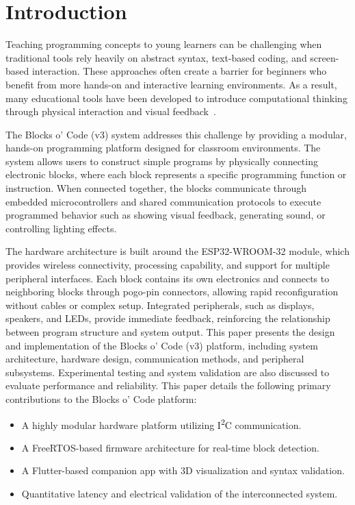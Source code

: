 \documentclass[10pt, conference]{IEEEtran}
\begin{document}
\section{Introduction}
Teaching programming concepts to young learners can be challenging when traditional tools rely heavily on abstract syntax, text-based coding, and screen-based interaction. These approaches often create a barrier for beginners who benefit from more hands-on and interactive learning environments. As a result, many educational tools have been developed to introduce computational thinking through physical interaction and visual feedback~\cite{educational,tangible}. 

The Blocks o’ Code (v3) system addresses this challenge by providing a modular, hands-on programming platform designed for classroom environments. The system allows users to construct simple programs by physically connecting electronic blocks, where each block represents a specific programming function or instruction. When connected together, the blocks communicate through embedded microcontrollers and shared communication protocols to execute programmed behavior such as showing visual feedback, generating sound, or controlling lighting effects. 

The hardware architecture is built around the ESP32-WROOM-32 module, which provides 
wireless connectivity, processing capability, and support for multiple peripheral interfaces. Each block contains its own electronics and connects to neighboring blocks through pogo-pin connectors, allowing rapid reconfiguration without cables or complex setup. Integrated peripherals, such as displays, speakers, and LEDs, provide immediate feedback, reinforcing the relationship between program structure and system output. This paper presents the design and implementation of the Blocks o’ Code (v3) platform, including system architecture, hardware design, communication methods, and peripheral subsystems. Experimental testing and system validation are also discussed to evaluate performance and reliability. 
This paper details the following primary contributions to the Blocks o' Code platform: 
\begin{itemize} 
\item A highly modular hardware platform utilizing I\textsuperscript{2}C communication. 
\item A FreeRTOS-based firmware architecture for real-time block detection. 
\item A Flutter-based companion app with 3D visualization and syntax validation. 
\item Quantitative latency and electrical validation of the interconnected system. 
\end{itemize}
\end{document}
